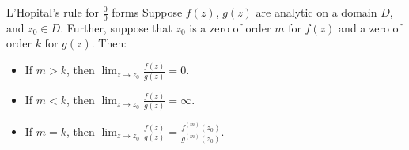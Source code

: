 \begin{thmbo}{L'Hopital's rule for $\frac{0}{0}$ forms}{}
Suppose $f(z)$, $g(z)$ are analytic on a domain $D$, and $z_0\in D$. Further, suppose that $z_0$ is a zero of order $m$ for $f(z)$ and a zero of order $k$ for $g(z)$. Then:

\begin{itemize}
\item If $m > k$, then $\lim_{z\rightarrow z_0} \frac{f(z)}{g(z)} = 0$.
\item If $m < k$, then $\lim_{z\rightarrow z_0} \frac{f(z)}{g(z)} = \infty$.
\item If $m = k$, then $\lim_{z\rightarrow z_0} \frac{f(z)}{g(z)} = \frac{f^{(m)}(z_0)}{g^{(m)}(z_0)}$.
\end{itemize}
\end{thmbo}


